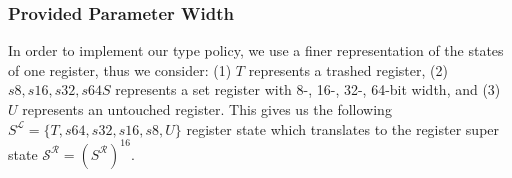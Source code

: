 
%
%

\subsubsection{Provided Parameter Width}
\label{subsection:providedparamwideness}
In order to implement our {type} policy, we use a finer representation of the states of one register, thus we consider:
(1) $T$ represents a trashed register,
(2) $s8, s16, s32, s64 S$ represents a set register with  8-, 16-, 32-, 64-bit width, and
(3) $U$ represents an untouched register.
This gives us the following $S^\mathcal{L} = \{ T, s64, s32, s16, s8, U \}$ register state which translates to the register 
super state $\mathcal{S}^\mathcal{R} = (S^\mathcal{R})^{16}$.

